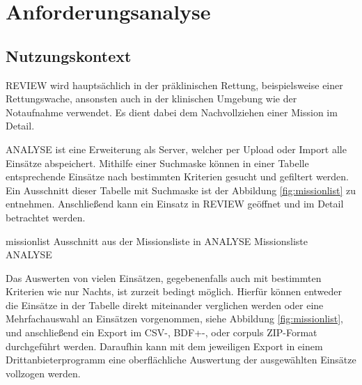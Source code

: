 \chapter{Anforderungsanalyse}
\label{kap:anforderungsanalyse}
\minitoc\pagebreak

\section{Nutzungskontext}
\label{sec:kontext}

\gls{REVIEW} wird hauptsächlich in der präklinischen Rettung, beispielsweise einer Rettungswache, ansonsten auch in der klinischen Umgebung wie der Notaufnahme verwendet.
Es dient dabei dem Nachvollziehen einer Mission im Detail.

\gls{ANALYSE} ist eine Erweiterung als Server, welcher per Upload oder Import alle Einsätze abspeichert. 
Mithilfe einer Suchmaske können in einer Tabelle entsprechende Einsätze nach bestimmten Kriterien gesucht und gefiltert werden.
Ein Ausschnitt dieser Tabelle mit Suchmaske ist der Abbildung \ref{fig:missionlist} zu entnehmen.
Anschließend kann ein Einsatz in \gls{REVIEW} geöffnet und im Detail betrachtet werden.

\bildbreit
{missionlist}
{Ausschnitt aus der \glqq Missionsliste\grqq{} in \gls{ANALYSE}}
{Missionsliste \gls{ANALYSE}}

Das Auswerten von vielen Einsätzen, gegebenenfalls auch mit bestimmten Kriterien wie \glqq nur Nachts\grqq, ist zurzeit bedingt möglich.
Hierfür können entweder die Einsätze in der Tabelle direkt miteinander verglichen werden oder eine Mehrfachauswahl an Einsätzen vorgenommen, siehe Abbildung \ref{fig:missionlist}, und anschließend ein Export im CSV-, BDF+-, oder \glqq corpuls ZIP\grqq -Format durchgeführt werden.
Daraufhin kann mit dem jeweiligen Export in einem Drittanbieterprogramm eine oberflächliche Auswertung der ausgewählten Einsätze vollzogen werden.


